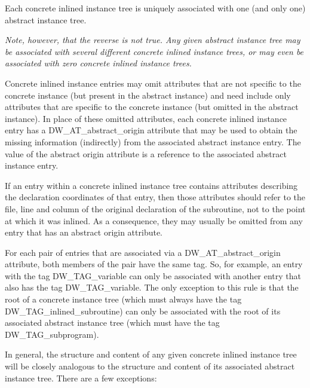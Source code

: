 Each concrete inlined instance tree is uniquely associated
with one (and only one) abstract instance tree.

\textit{Note, however, that the reverse is not true. Any given abstract
instance tree may be associated with several different concrete
inlined instance trees, or may even be associated with zero
concrete inlined instance trees.}

Concrete inlined instance entries may omit attributes that
are not specific to the concrete instance (but present in
the abstract instance) and need include only attributes that
are specific to the concrete instance (but omitted in the
abstract instance). In place of these omitted attributes, each
concrete inlined instance entry has a DW\_AT\_abstract\_origin
attribute that may be used to obtain the missing information
(indirectly) from the associated abstract instance entry. The
value of the abstract origin attribute is a reference to the
associated abstract instance entry.

If an entry within a concrete inlined instance tree contains
attributes describing the declaration coordinates of that
entry, then those attributes should refer to the file, line
and column of the original declaration of the subroutine,
not to the point at which it was inlined. As a consequence,
they may usually be omitted from any entry that has an abstract
origin attribute.

For each pair of entries that are associated via a
DW\-\_AT\-\_abstract\-\_origin attribute, both members of the pair
have the same tag. So, for example, an entry with the tag
DW\-\_TAG\-\_variable can only be associated with another entry
that also has the tag DW\-\_TAG\-\_variable. The only exception
to this rule is that the root of a concrete instance tree
(which must always have the tag DW\-\_TAG\-\_\-inlined\_subroutine)
can only be associated with the root of its associated abstract
instance tree (which must have the tag DW\-\_TAG\-\_subprogram).

In general, the structure and content of any given concrete
inlined instance tree will be closely analogous to the
structure and content of its associated abstract instance
tree. There are a few exceptions:

